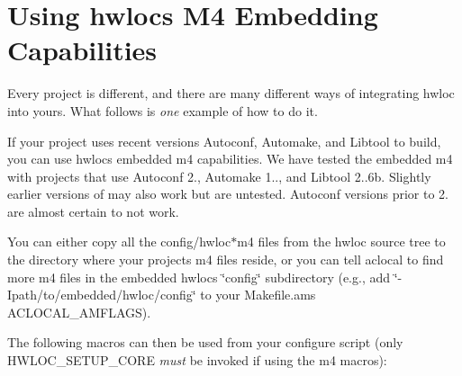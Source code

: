  \hypertarget{a00393_embedding_m4}{}\section{Using hwloc\textquotesingle{}s M4 Embedding Capabilities}\label{a00393_embedding_m4}
Every project is different, and there are many different ways of integrating hwloc into yours. What follows is {\itshape one} example of how to do it.

If your project uses recent versions Autoconf, Automake, and Libtool to build, you can use hwloc\textquotesingle{}s embedded m4 capabilities. We have tested the embedded m4 with projects that use Autoconf 2., Automake 1.., and Libtool 2..\+6b. Slightly earlier versions of may also work but are untested. Autoconf versions prior to 2. are almost certain to not work.

You can either copy all the config/hwloc$\ast$m4 files from the hwloc source tree to the directory where your project\textquotesingle{}s m4 files reside, or you can tell aclocal to find more m4 files in the embedded hwloc\textquotesingle{}s \char`\"{}config\char`\"{} subdirectory (e.\+g., add \char`\"{}-\/\+Ipath/to/embedded/hwloc/config\char`\"{} to your Makefile.\+am\textquotesingle{}s A\+C\+L\+O\+C\+A\+L\+\_\+\+A\+M\+F\+L\+A\+GS).

The following macros can then be used from your configure script (only H\+W\+L\+O\+C\+\_\+\+S\+E\+T\+U\+P\+\_\+\+C\+O\+RE {\itshape must} be invoked if using the m4 macros)\+:


